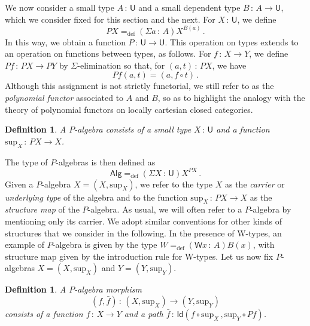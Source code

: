 \documentclass[10pt,a4paper,oneside,reqno]{amsart}
\theoremstyle{mythm}
\theoremstyle{mydef}
\newtheorem{definition}[theorem]{Definition}
\theoremstyle{myrmk}
\newcommand{\defeq}{=_{\mathrm{def}}}
\newcommand{\co}{\,{:}\,}
\newcommand{\Id}{\mathsf{Id}}
\newcommand{\W}{\mathsf{W}}
\newcommand{\U}{\mathsf{U}}
\newcommand{\Palg}{\mathsf{Alg}}
\renewcommand{\sup}{\mathrm{sup}}
\begin{document}
We now consider a small type $A \co \U$ and a small dependent type $B \co A \to \U$, which we consider
fixed for this section and the next. For $X \co \U$,
we define
\[
PX \defeq (\Sigma a \co A) X^{B(a)} \, .
\]
In this way, we obtain a function $P \co \U \to \U$. This operation on types extends to an operation on functions between 
 types, as follows. For $f \co X\to Y$, we define $P f  \co PX\to PY$ by $\Sigma$-elimination
so that, for $(a, t) \co PX$, we have 
\[
Pf (a, t) = (a,f\circ t) \, .
\] 
Although this assignment is not strictly functorial, we still refer to  as the \emph{polynomial functor} associated to $A$ and $B$, so as to highlight the analogy with the theory of polynomial functors on locally cartesian closed categories.

\begin{definition} A \emph{$P$-algebra} consists of a small type $X \co \U$ and a function $\sup_X \co PX \to X$. 
\end{definition}

\smallskip

 The type of $P$-algebras is then defined as 
 \[
 \Palg  \defeq (\Sigma X \co \U) X^{PX} \, .
 \]
 Given a $P$-algebra $X = (X, \sup_X)$,
 we refer to the type $X$ as the \emph{carrier} or \emph{underlying type} of the algebra and to the function $\sup_X \co PX\to X$ as the \emph{structure map} of the $P$-algebra. 
 As usual,  we will often refer to a 
 $P$-algebra by mentioning only its carrier. We adopt similar conventions for other kinds of structures that we consider
 in the following.  In the
 presence of W-types, an example of $P$-algebra is given by the type $W \defeq (\W x\co A)B(x)$, with structure map given by the introduction rule for W-types. 
Let us now fix $P$-algebras $X = (X, \sup_X)$ and $Y = (Y, \sup_Y)$. 

\begin{definition} A \emph{$P$-algebra morphism}
\[
(f, \bar{f}) \co (X, \sup_X) \rightarrow (Y, \sup_Y)
\]
consists of a function $f \co X \rightarrow Y$ and a path $\bar{f} \co \Id( f \circ \sup_X \, ,  \sup_{Y} \circ P f )$.
\end{definition}
\end{document}
